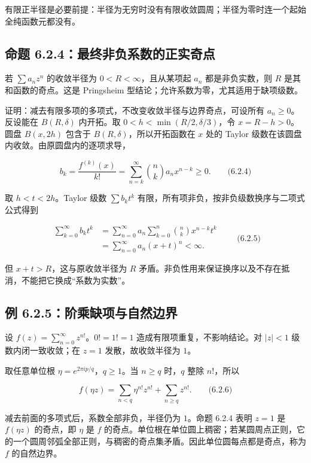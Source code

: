 \documentclass[11pt,a4paper]{article}
\begin{document}
有限正半径是必要前提：半径为无穷时没有有限收敛圆周；半径为零时连一个起始全纯函数元都没有。

\subsection{命题 6.2.4：最终非负系数的正实奇点}\label{ch06-s2-heading-4}

若 \(\sum a_nz^n\) 的收敛半径为 \(0<R<\infty\)，且从某项起 \(a_n\)
都是非负实数，则 \(R\) 是其和函数的奇点。这是 Pringsheim
型结论；允许系数为零，尤其适用于缺项级数。

证明：减去有限多项的多项式，不改变收敛半径与边界奇点，可设所有
\(a_n\ge0\)。反设能在 \(B(R,\delta)\) 内开拓。取
\(0<h<\min(R/2,\delta/3)\)，令 \(x=R-h>0\)。圆盘 \(B(x,2h)\) 包含于
\(B(R,\delta)\)，所以开拓函数在 \(x\) 处的 Taylor
级数在该圆盘内收敛。由原圆盘内的逐项求导，

\[
b_k=\frac{f^{(k)}(x)}{k!}=\sum_{n=k}^{\infty}\binom nk a_nx^{n-k}\ge0.
\qquad\text{(6.2.4)}
\]

取 \(h<t<2h\)。Taylor 级数 \(\sum b_kt^k\)
有限，所有项非负，按非负级数换序与二项式公式得到

\[
\begin{aligned}
\sum_{k=0}^{\infty}b_kt^k
&=\sum_{n=0}^{\infty}a_n\sum_{k=0}^n\binom nk x^{n-k}t^k\\
&=\sum_{n=0}^{\infty}a_n(x+t)^n<\infty.
\end{aligned}\qquad\text{(6.2.5)}
\]

但 \(x+t>R\)，这与原收敛半径为 \(R\)
矛盾。非负性用来保证换序以及不存在抵消，不能把它换成``系数为实数''。

\subsection{例 6.2.5：阶乘缺项与自然边界}\label{ch06-s2-heading-5}

设 \(f(z)=\sum_{n=0}^{\infty}z^{n!}\)。\(0!=1!=1\)
造成有限项重复，不影响结论。对 \(|z|<1\) 级数内闭一致收敛；在 \(z=1\)
发散，故收敛半径为 \(1\)。

取任意单位根 \(\eta=e^{2\pi ip/q}\)，\(q\ge1\)。当 \(n\ge q\) 时，\(q\)
整除 \(n!\)，所以

\[
f(\eta z)=\sum_{n<q}\eta^{n!}z^{n!}+\sum_{n\ge q}z^{n!}.
\qquad\text{(6.2.6)}
\]

减去前面的多项式后，系数全部非负，半径仍为 \(1\)。命题 6.2.4 表明
\(z=1\) 是 \(f(\eta z)\) 的奇点，即 \(\eta\) 是 \(f\)
的奇点。单位根在单位圆上稠密；若某圆周点正则，它的一个圆周邻弧全部正则，与稠密的奇点集矛盾。因此单位圆每点都是奇点，称为
\(f\) 的自然边界。
\end{document}
